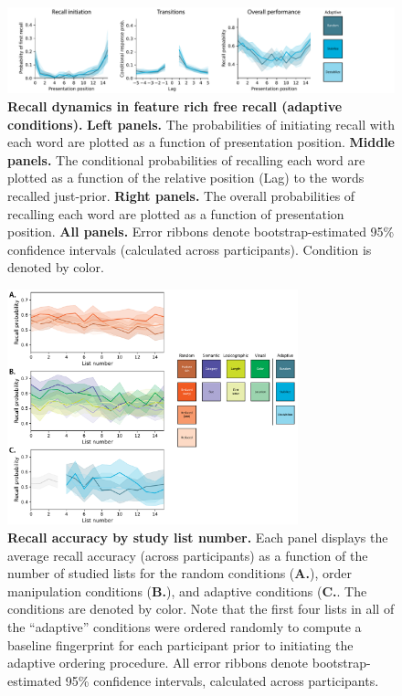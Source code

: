 \documentclass{article}
\begin{document}
\begin{figure}[p] \centering
    \includegraphics[width=\textwidth]{figures/recall_dynamics_adaptive}
    
    \caption{\textbf{Recall dynamics in feature rich free recall (adaptive conditions).} \textbf{Left panels.} The probabilities of
    initiating recall with each word are plotted as a function of presentation
    position. \textbf{Middle panels.} The conditional probabilities of recalling
    each word are plotted as a function of the relative position (Lag) to the words
    recalled just-prior. \textbf{Right panels.} The overall probabilities of
    recalling each word are plotted as a function of presentation position.
    \textbf{All panels.} Error ribbons denote bootstrap-estimated 95\% confidence
    intervals (calculated across participants). Condition is denoted by color.}
    
        \label{fig:recall-dynamics-adaptive}
    \end{figure}


\begin{figure}[tp] \centering
    \includegraphics[width=0.75\textwidth]{figures/accuracy_by_list}
    
    \caption{\textbf{Recall accuracy by study list number.}  Each panel displays the average recall accuracy (across participants) as a function of the number of studied lists for the
    random conditions (\textbf{A.}), order manipulation conditions (\textbf{B.}), and adaptive conditions (\textbf{C.}.  The conditions are denoted by color.  Note that the first four
    lists in all of the ``adaptive'' conditions were ordered randomly to compute a baseline fingerprint for each participant prior to initiating the adaptive ordering procedure.  All error
    ribbons denote bootstrap-estimated 95\% confidence intervals, calculated across participants.}
        \label{fig:accuracy-by-list}
\end{figure}
\end{document}
